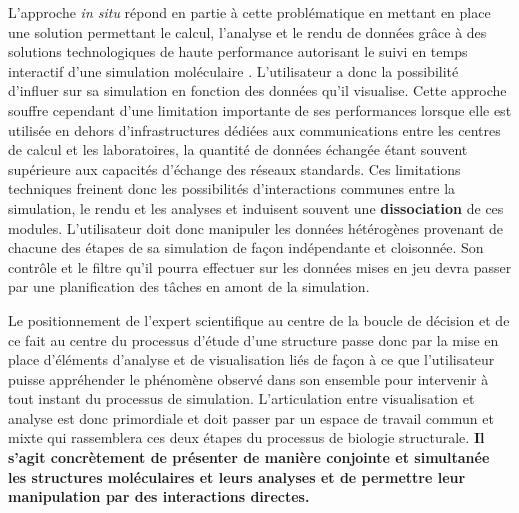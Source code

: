 L'approche \textit{in situ} répond en partie à cette problématique en mettant en place une solution permettant le calcul, l'analyse et le rendu de données grâce à des solutions technologiques de haute performance autorisant le suivi en temps interactif d'une simulation moléculaire \cite{dreher_interactive_2013,kuhlen2011parallel,ma2009situ}. L'utilisateur a donc la possibilité d'influer sur sa simulation en fonction des données qu'il visualise.
Cette approche souffre cependant d'une limitation importante de ses performances lorsque elle est utilisée en dehors d'infrastructures dédiées aux communications entre les centres de calcul et les laboratoires, la quantité de données échangée étant souvent supérieure aux capacités d'échange des réseaux standards. Ces limitations techniques freinent donc les possibilités d'interactions communes entre la simulation, le rendu et les analyses et induisent souvent une \textbf{dissociation} de ces modules. L'utilisateur doit donc manipuler les données hétérogènes provenant de chacune des étapes de sa simulation de façon indépendante et cloisonnée. Son contrôle et le filtre qu'il pourra effectuer sur les données mises en jeu devra passer par une planification des tâches en amont de la simulation.

Le positionnement de l'expert scientifique au centre de la boucle de décision et de ce fait au centre du processus d'étude d'une structure passe donc par la mise en place d'éléments d'analyse et de visualisation liés de façon à ce que l'utilisateur puisse appréhender le phénomène observé dans son ensemble pour intervenir à tout instant du processus de simulation. 
L'articulation entre visualisation et analyse est donc primordiale et doit passer par un espace de travail commun et mixte qui rassemblera ces deux étapes du processus de biologie structurale. \textbf{Il s’agit concrètement de présenter de manière conjointe et simultanée les structures moléculaires et leurs analyses et de permettre leur manipulation par des interactions directes.}

